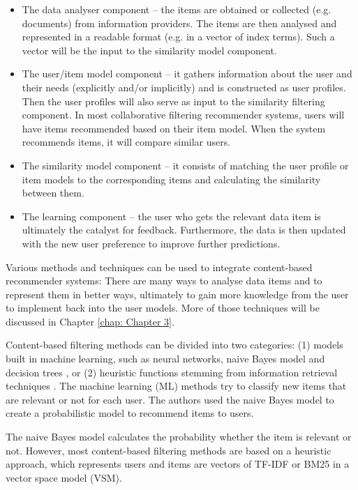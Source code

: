 \begin{itemize}
    \item The data analyser component – the items are obtained or collected (e.g. documents) from information providers. The items are then analysed and represented in a readable format (e.g. in a vector of index terms).
    Such a vector will be the input to the similarity model component.
    \item The user/item model component – it gathers information about the user and their needs (explicitly and/or implicitly) and is constructed as user profiles. Then the user profiles will also serve as input to the similarity filtering component. In most collaborative filtering recommender systems, users will have items recommended based on their item model.
    When the system recommends items, it will compare similar users.
    \item The similarity model component – it consists of matching the user profile or item models to the corresponding items and calculating the similarity between them.
    \item The learning component – the user who gets the relevant data item is ultimately the catalyst for feedback. Furthermore, the data is then updated with the new user preference to improve further predictions.
\end{itemize}

Various methods and techniques can be used to integrate content-based recommender systems: There are many ways to analyse data items and to represent them in better ways, ultimately to gain more knowledge from the user to implement back into  the user models. More of those techniques will be discussed in Chapter \ref{chap: Chapter 3}.

Content-based filtering methods can be divided into two categories: (1) models built in machine learning, such as neural networks, naive Bayes model and decision trees \cite{lops2011content}, or (2) heuristic functions stemming from information retrieval techniques \cite{cantador2010content,diederich2006finding}. The machine learning (ML) methods try to classify new items that are relevant or not for each user. The authors \cite{lops2011content} used the naive Bayes model to create a probabilistic model to recommend items to users.

The naive Bayes model calculates the probability whether the item is relevant or not. However, most content-based filtering methods are based on a heuristic approach, which represents users and items are vectors of TF-IDF \cite{jones2004statistical} or BM25 \cite{baeza1999modern} in a vector space model (VSM).

